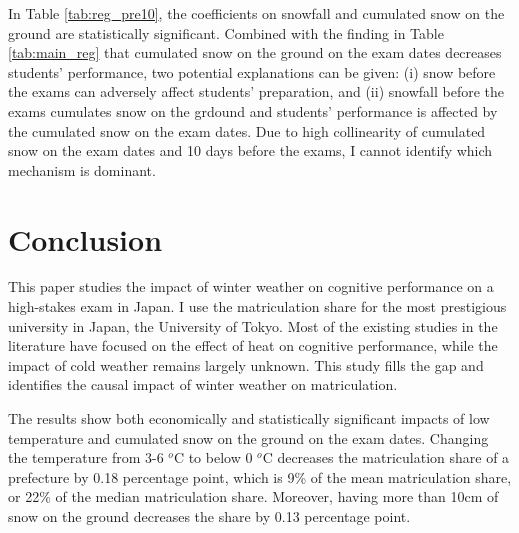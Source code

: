 \documentclass[12pt,letterpaper]{article}
\begin{document}
In Table \ref{tab:reg_pre10}, the coefficients on snowfall and cumulated snow on the ground are statistically significant.
Combined with the finding in Table \ref{tab:main_reg} that cumulated snow on the ground on the exam dates decreases students' performance, two potential explanations can be given:
(i) snow before the exams can adversely affect students' preparation, and
(ii) snowfall before the exams cumulates snow on the grdound and students' performance is affected by the cumulated snow on the exam dates.
Due to high collinearity of cumulated snow on the exam dates and 10 days before the exams, I cannot identify which mechanism is dominant.

%  

\section{Conclusion}\label{sec:conclusion}

This paper studies the impact of winter weather on cognitive performance on a high-stakes exam in Japan.
I use the matriculation share for the most prestigious university in Japan, the University of Tokyo.
Most of the existing studies in the literature have focused on the effect of heat on cognitive performance, while the impact of cold weather remains largely unknown.
This study fills the gap and identifies the causal impact of winter weather on matriculation.

The results show both economically and statistically significant impacts of low temperature and cumulated snow on the ground on the exam dates.
Changing the temperature from 3-6 $^o$C to below 0 $^o$C decreases the matriculation share of a prefecture by 0.18 percentage point, which is 9\% of the mean matriculation share, or 22\% of the median matriculation share.
Moreover, having more than 10cm of snow on the ground decreases the share by 0.13 percentage point.
\end{document}
